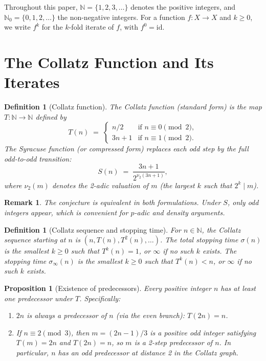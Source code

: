 \documentclass[12pt,a4paper]{article}
\newtheorem{proposition}[theorem]{Proposition}
\newtheorem{definition}[theorem]{Definition}
\newtheorem{remark}[theorem]{Remark}
\begin{document}
Throughout this paper, $\mathbb{N} = \{1, 2, 3, \ldots\}$ denotes the positive integers,
and $\mathbb{N}_0 = \{0, 1, 2, \ldots\}$ the non-negative integers. For a function
$f\colon X \to X$ and $k \geq 0$, we write $f^k$ for the $k$-fold iterate of $f$,
with $f^0 = \mathrm{id}$.

\section{The Collatz Function and Its Iterates}

\begin{definition}[Collatz function]\label{def:collatz}
The \emph{Collatz function} (standard form) is the map $T\colon \mathbb{N} \to \mathbb{N}$
defined by
\[
  T(n) \;=\; \begin{cases} n/2 & \text{if } n \equiv 0 \pmod{2}, \\
                            3n+1 & \text{if } n \equiv 1 \pmod{2}.
              \end{cases}
\]
The \emph{Syracuse function} (or compressed form) replaces each odd step by the full
odd-to-odd transition:
\[
  S(n) \;=\; \frac{3n+1}{2^{\nu_2(3n+1)}},
\]
where $\nu_2(m)$ denotes the 2-adic valuation of $m$ (the largest $k$ such that $2^k \mid m$).
\end{definition}

\begin{remark}\label{rem:equivalent}
The conjecture is equivalent in both formulations. Under $S$, only odd integers appear,
which is convenient for $p$-adic and density arguments.
\end{remark}

\begin{definition}[Collatz sequence and stopping time]\label{def:sequence}
For $n \in \mathbb{N}$, the \emph{Collatz sequence} starting at $n$ is
$(n, T(n), T^2(n), \ldots)$.
The \emph{total stopping time} $\sigma(n)$ is the smallest $k \geq 0$ such that
$T^k(n) = 1$, or $\infty$ if no such $k$ exists.
The \emph{stopping time} $\sigma_\infty(n)$ is the smallest $k \geq 0$ such that
$T^k(n) < n$, or $\infty$ if no such $k$ exists.
\end{definition}

\begin{proposition}[Existence of predecessors]\label{prop:pred}
Every positive integer $n$ has at least one predecessor under $T$. Specifically:
\begin{enumerate}
  \item[(i)] $2n$ is always a predecessor of $n$ (via the even branch): $T(2n) = n$.
  \item[(ii)] If $n \equiv 2 \pmod{3}$, then $m = (2n-1)/3$ is a positive odd integer
              satisfying $T(m) = 2n$ and $T(2n) = n$, so $m$ is a 2-step predecessor of $n$.
              In particular, $n$ has an odd predecessor at distance 2 in the Collatz graph.
\end{enumerate}
\end{proposition}
\end{document}
